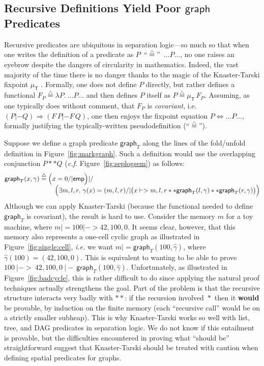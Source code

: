 \documentclass[acmsmall,screen]{acmart}
\newcommand{\defeq}{\mathbin{\stackrel{\triangle}{=}}}
\newcommand{\p}[1]{\ensuremath{\mathsf{#1}}} \newcommand{\m}[1]{\ensuremath{\mathit{#1}}} \newcommand{\ma}[1]{\ensuremath{\mathcal{#1}}} \let\ramify\lightning
\begin{document}
\subsection{Recursive Definitions Yield Poor \p{graph} Predicates}\label{sec:fixpointfail}

\newcommand{\graphkt}{\p{graph}_T}
\newcommand{\grapham}{\p{graph}_A}


Recursive predicates are ubiquitous in separation logic---so
much so that when one writes the definition of a predicate as
\mbox{$P$ ``$\defeq$'' $\ldots P \! \ldots$}, no one raises an eyebrow despite the
dangers of circularity in mathematics. Indeed, the vast majority of the time there
is no danger thanks to the magic of the Knaster-Tarski fixpoint
$\mu_{\mathsf{T}}$ \cite{tarski:fixpoint}.  Formally, one does not define $P$ directly,
but rather defines a functional
\mbox{$F_P \defeq \lambda P.~ \ldots P \! \ldots$} and then defines $P$ itself as
\mbox{$P \defeq \mu_{\mathsf{T}} \, F_P$}.
Assuming, as one typically does without comment,
that $F_P$ is \emph{covariant}, i.e. $(P |- Q)
\Rightarrow (F \, P |- F \, Q)$, one then enjoys the fixpoint
equation $P \Leftrightarrow \ldots P \ldots$, formally justifying
the typically-written pseudodefinition (``$\defeq$'').



Suppose we define a graph predicate $\graphkt$ along the lines of the fold/unfold definition in Figure~\ref{fig:markgraph}.  Such a definition would use the overlapping conjunction $P ** Q$ (\emph{c.f.} Figure~\ref{fig:seplogsem}) as follows: \vspace{-1ex}
\[
\begin{array}{@{}l@{}l@{}}
\graphkt(x, \gamma) \; \defeq \; &\Big(x = 0 /| \p{emp}\Big) |/ \\
&\quad \Big(\exists m,l,r.~ \gamma(x)=(m,l,r) /|
\big(x |-> m,l,r ** \graphkt(l, \gamma) ** \graphkt(r, \gamma)\big)\Big)
\end{array}
\vspace{-1ex}
\]
Although we can apply Knaster-Tarski (because the functional needed to
define $\graphkt$ is covariant), the result is hard to use.
Consider the memory $m$ for a toy machine, where $m |= 100 |-> 42,100,0$.
It seems clear, however, that this
memory also represents a one-cell cyclic graph as illustrated in
Figure~\ref{fig:single:cell}, \emph{i.e.} we want
$m |= \graphkt(100,\hat{\gamma})$, where 
$\hat{\gamma}(100) = (42,100,0)$.  This is equivalent to wanting to be able to 
prove $100~|->~42,100,0~|-~\graphkt(100,\hat{\gamma})$.  Unfortunately, as 
illustrated in Figure~\ref{fig:badcycle}, this is rather difficult to do since 
applying the natural proof techniques actually strengthens the goal.
Part of the 
problem is that the recursive structure interacts very badly with $**$: if the 
recursion involved~$*$~then it \textbf{would} be provable, by induction on the 
finite memory (each ``recursive call'' would be on a strictly smaller subheap).  
This is why Knaster-Tarski works so well with list, tree, and DAG predicates in 
separation logic.  We do not know if this entailment is provable, but the 
difficulties encountered in proving what ``should be'' straightforward suggest 
that Knaster-Tarski should be treated with caution when defining spatial 
predicates for graphs.
\end{document}
